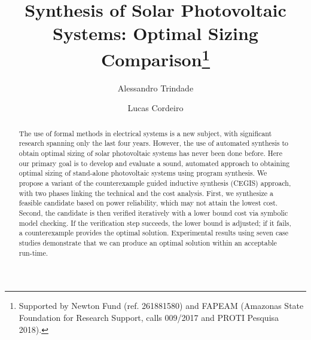 \documentclass[runningheads]{llncs}
\begin{document}
%
\title{Synthesis of Solar Photovoltaic Systems: Optimal Sizing Comparison\thanks{Supported by Newton Fund (ref. 261881580) and FAPEAM (Amazonas State Foundation for Research Support, calls 009/2017 and PROTI Pesquisa 2018).}}
%
%
\author{Alessandro Trindade \and Lucas Cordeiro} %
%
%
\maketitle              %

\begin{abstract}
The use of formal methods in electrical systems is a new subject, with significant research spanning only the last four years. However, the use of automated synthesis to obtain optimal sizing of solar photovoltaic systems has never been done before. Here our primary goal is to develop and evaluate a sound, automated approach to obtaining optimal sizing of stand-alone photovoltaic systems using program synthesis. We propose a variant of the counterexample guided inductive synthesis (CEGIS) approach, with two phases linking the technical and the cost analysis. First, we synthesize a feasible candidate based on power reliability, which may not attain the lowest cost. Second, the candidate is then verified iteratively with a lower bound cost via symbolic model checking. If the verification step succeeds, the lower bound is adjusted; if it fails, a counterexample provides the optimal solution. Experimental results using seven case studies demonstrate that we can produce an optimal solution within an acceptable run-time. 
\end{abstract}
\end{document}

